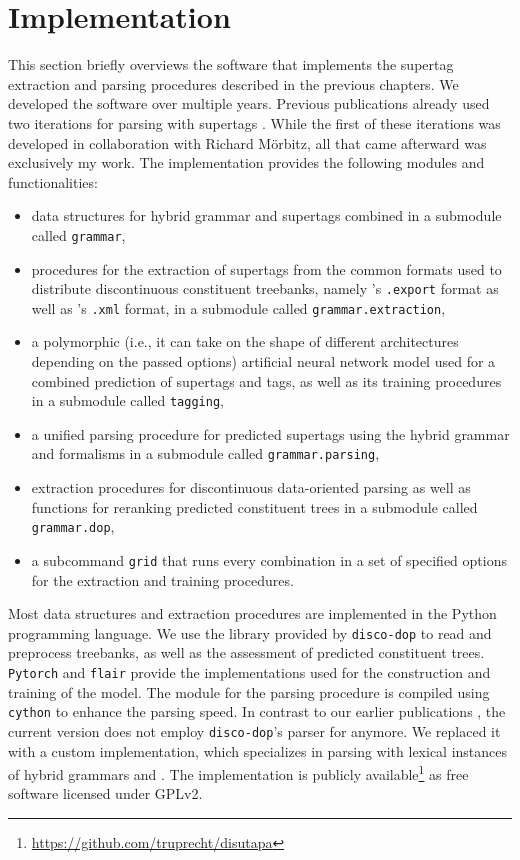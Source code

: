 \documentclass[../../document.tex]{subfiles}
\begin{document}
    \section{Implementation}\label{sec:implementation}
    This section briefly overviews the software that implements the supertag extraction and parsing procedures described in the previous chapters.
    We developed the software over multiple years. Previous publications already used two iterations for parsing with  supertags \citep{RupMoe21,Rup22}.
    While the first of these iterations was developed in collaboration with Richard Mörbitz, all that came afterward was exclusively my work.
    The implementation provides the following modules and functionalities:
    \begin{itemize}
        \item data structures for hybrid grammar and  supertags combined in a submodule called \texttt{grammar},
        \item procedures for the extraction of supertags from the common formats used to distribute discontinuous constituent treebanks, namely \negra{}'s \texttt{.export} format as well as \tiger{}'s \texttt{.xml} format, in a submodule called \texttt{grammar.extraction},
        \item a polymorphic (i.e., it can take on the shape of different architectures depending on the passed options) artificial neural network model used for a combined prediction of supertags and  tags, as well as its training procedures in a submodule called \texttt{tagging},
        \item a unified parsing procedure for predicted supertags using the hybrid grammar and  formalisms in a submodule called \texttt{grammar.parsing},
        \item extraction procedures for discontinuous data-oriented parsing as well as functions for reranking predicted constituent trees in a submodule called \texttt{grammar.dop},
        \item a subcommand \texttt{grid} that runs every combination in a set of specified options for the extraction and training procedures.
    \end{itemize}

    Most data structures and extraction procedures are implemented in the Python programming language.
    We use the library provided by \texttt{disco-dop} \citep{Cra12} to read and preprocess treebanks, as well as the assessment of predicted constituent trees.
    \texttt{Pytorch} \citep{paszke2019pytorch} and \texttt{flair} \citep{Akb19} provide the implementations used for the construction and training of the  model.
    The module for the parsing procedure is compiled using \texttt{cython} \citep{behnel2011cython} to enhance the parsing speed.
    In contrast to our earlier publications \citep{RupMoe21,Rup22}, the current version does not employ \texttt{disco-dop}'s parser for  anymore.
    We replaced it with a custom implementation, which specializes in parsing with lexical instances of hybrid grammars and .
    The implementation is publicly available\footnote{\url{https://github.com/truprecht/disutapa}} as free software licensed under GPLv2.
\end{document}
